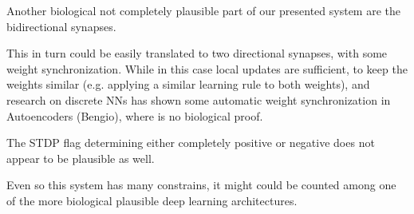 Another biological not completely plausible part of our presented system are the bidirectional synapses.

This in turn could be easily translated to two directional synapses, with some weight synchronization. While in this case local updates are sufficient, to keep the weights similar (e.g. applying a similar learning rule to both weights), and research on discrete NNs has shown some automatic weight synchronization in Autoencoders (Bengio), where is no biological proof.

The STDP flag determining either completely positive or negative does not appear to be plausible as well.

Even so this system has many constrains, it might could be counted among one of the more biological plausible deep learning architectures.     




 